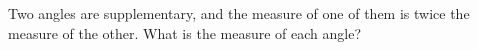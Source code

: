 Two angles are supplementary, and the measure of one of them is twice the measure of the other. What is the measure of each angle?
